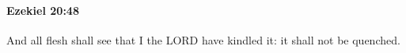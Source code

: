 
		\paragraph{Ezekiel 20:48} %
			\label{EZEKIEL-20-48}

			And all flesh shall see that I the LORD have kindled it: it shall not be quenched.


